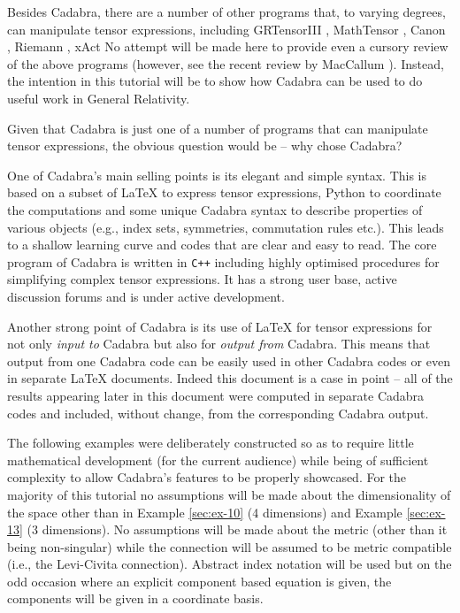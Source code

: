 \documentclass[a4paper,12pt]{article}
\numberwithin{equation}{section}%
\begin{document}
Besides Cadabra, there are a number of other programs that, to varying degrees,
can manipulate tensor expressions, including
GRTensorIII \cite{grtensorIII:2017-01},
MathTensor \cite{mathtensor:2008-01},
Canon \cite{manssur:2004-01},
Riemann \cite{portugal:1997-01},
xAct \cite{xact:2008-01}
No attempt will be made here to provide even a cursory review of the above programs
(however, see the recent review by MacCallum \cite{maccallum:2018-01}). Instead, the
intention in this tutorial will be to show how Cadabra can be used to do useful work in
General Relativity.

Given that Cadabra is just one of a number of programs that can manipulate tensor
expressions, the obvious question would be -- why chose Cadabra?

One of Cadabra's main selling points is its elegant and simple syntax. This is based on a
subset of LaTeX to express tensor expressions, Python to coordinate the computations and some
unique Cadabra syntax to describe properties of various objects (e.g., index sets,
symmetries, commutation rules etc.). This leads to a shallow learning curve and codes that
are clear and easy to read. The core program of Cadabra is written in {\tt C++} including
highly optimised procedures for simplifying complex tensor expressions. It has a strong user
base, active discussion forums and is under active development.

Another strong point of Cadabra is its use of LaTeX for tensor expressions for not only
\emph{input to} Cadabra but also for \emph{output from} Cadabra. This means that output from
one Cadabra code can be easily used in other Cadabra codes or even in separate LaTeX
documents. Indeed this document is a case in point -- all of the results appearing later in
this document were computed in separate Cadabra codes and included, without change, from the
corresponding Cadabra output.

The following examples were deliberately constructed so as to require little mathematical
development (for the current audience) while being of sufficient complexity to allow
Cadabra's features to be properly showcased. For the majority of this tutorial no
assumptions will be made about the dimensionality of the space other than in Example
\ref{sec:ex-10} (4 dimensions) and Example \ref{sec:ex-13} (3 dimensions). No assumptions
will be made about the metric (other than it being non-singular) while the connection will
be assumed to be metric compatible (i.e., the Levi-Civita connection). Abstract index
notation will be used but on the odd occasion where an explicit component based equation is
given, the components will be given in a coordinate basis.
\end{document}
